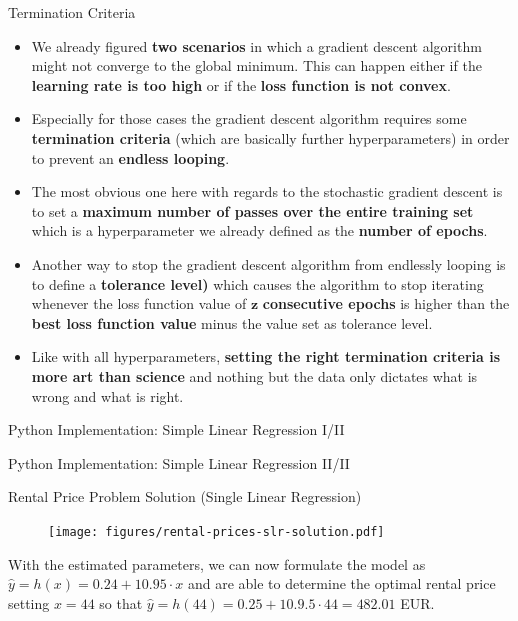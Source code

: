 \documentclass[main.tex]{subfiles}
\begin{document}
    \begin{frame}{Termination Criteria}
        \begin{itemize}
            \item We already figured \textbf{two scenarios} in which a gradient descent algorithm might not converge to the global minimum. This can happen either if the \textbf{learning rate is too high} or if the \textbf{loss function is not convex}.
            \item Especially for those cases the gradient descent algorithm requires some \textbf{termination criteria} (which are basically further hyperparameters) in order to prevent an \textbf{endless looping}.
            \item The most obvious one here with regards to the stochastic gradient descent is to set a \textbf{maximum number of passes over the entire training set} which is a hyperparameter we already defined as the \textbf{number of epochs}.
            \item Another way to stop the gradient descent algorithm from endlessly looping is to define a \textbf{tolerance level)} which causes the algorithm to stop iterating whenever the loss function value of $\pmb{z}$ \textbf{consecutive epochs} is higher than the \textbf{best loss function value} minus the value set as tolerance level.
            \item Like with all hyperparameters, \textbf{setting the right termination criteria is more art than science} and nothing but the data only dictates what is wrong and what is right.
        \end{itemize}
    \end{frame}

    \begin{frame}{Python Implementation: Simple Linear Regression I/II}
        
    \end{frame}
    
    \begin{frame}{Python Implementation: Simple Linear Regression II/II}
        
    \end{frame}
    
    \begin{frame}{Rental Price Problem Solution (Single Linear Regression)}
        \begin{figure}
            \label{fig:rental-prices-slr-solution}
            \texttt{[image: figures/rental-prices-slr-solution.pdf]}
        \end{figure}
    
        With the estimated parameters, we can now formulate the model as $\hat y = h(x) = 0.24 + 10.95 \cdot x$ and are able to determine the optimal rental price setting $x = 44$ so that $\hat y = h(44) = 0.25 + 10.9.5 \cdot 44 = 482.01$ EUR.
    \end{frame}
    
\end{document}
